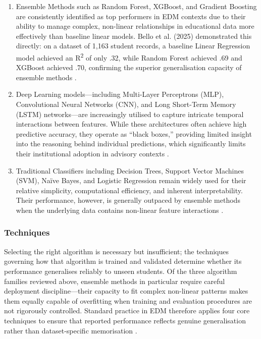 \documentclass[12pt]{report}
\begin{document}
\begin{enumerate}
    \item Ensemble Methods such as Random Forest, XGBoost, and Gradient
    Boosting are consistently identified as top performers in EDM contexts
    due to their ability to manage complex, non-linear relationships in
    educational data more effectively than baseline linear models. Bello
    et al. (2025) demonstrated this directly: on a dataset of 1,163 student
    records, a baseline Linear Regression model achieved an R\textsuperscript{2}
    of only .32, while Random Forest achieved .69 and XGBoost achieved .70,
    confirming the superior generalisation capacity of ensemble methods
    \parencite{bello2025}.

    \item Deep Learning models---including Multi-Layer Perceptrons (MLP),
    Convolutional Neural Networks (CNN), and Long Short-Term Memory (LSTM)
    networks---are increasingly utilised to capture intricate temporal
    interactions between features. While these architectures often achieve
    high predictive accuracy, they operate as ``black boxes,'' providing
    limited insight into the reasoning behind individual predictions, which
    significantly limits their institutional adoption in advisory contexts
    \parencite{kwakye2025, aldowah2026}.

    \item Traditional Classifiers including Decision Trees, Support
    Vector Machines (SVM), Na\"{i}ve Bayes, and Logistic Regression remain
    widely used for their relative simplicity, computational efficiency,
    and inherent interpretability. Their performance, however, is generally
    outpaced by ensemble methods when the underlying data contains
    non-linear feature interactions \parencite{bello2025}.
\end{enumerate}

\subsubsection{Techniques}
Selecting the right algorithm is necessary but insufficient; the
techniques governing how that algorithm is trained and validated
determine whether its performance generalises reliably to unseen
students. Of the three algorithm families reviewed above, ensemble
methods in particular require careful deployment discipline---their
capacity to fit complex non-linear patterns makes them equally capable
of overfitting when training and evaluation procedures are not
rigorously controlled. Standard practice in EDM therefore applies
four core techniques to ensure that reported performance reflects
genuine generalisation rather than dataset-specific memorisation
\parencite{bello2025, aldowah2026}.
\end{document}
